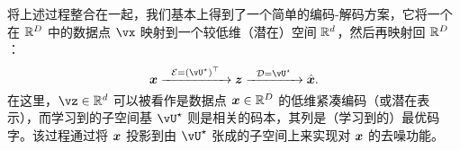 \documentclass[../../book-main.tex]{subfiles}
\begin{document}
将上述过程整合在一起，我们基本上得到了一个简单的编码-解码方案，它将一个在 $\mathbb{R}^D$ 中的数据点 $\vx$ 映射到一个较低维（潜在）空间 $\mathbb{R}^d$，然后再映射回 $\mathbb{R}^D$：
\begin{equation}
\x \xrightarrow{\hspace{2mm} \mathcal{E} = (\vU^\star)^\top \hspace{2mm}}  \z
    \xrightarrow{\hspace{2mm} \mathcal{D} = \vU^\star \hspace{2mm}}   \hat{\x}.  
\label{eqn:autoencoding-PCA}
\end{equation}
在这里，$\vz \in \R^d$ 可以被看作是数据点 $\bm{x} \in \mathbb{R}^D$ 的低维紧凑编码（或潜在表示），而学习到的子空间基 $\vU^\star$ 则是相关的码本，其列是（学习到的）最优码字。该过程通过将 $\bm{x}$ 投影到由 $\vU^\star$ 张成的子空间上来实现对 $\bm{x}$ 的去噪功能。
\end{document}
